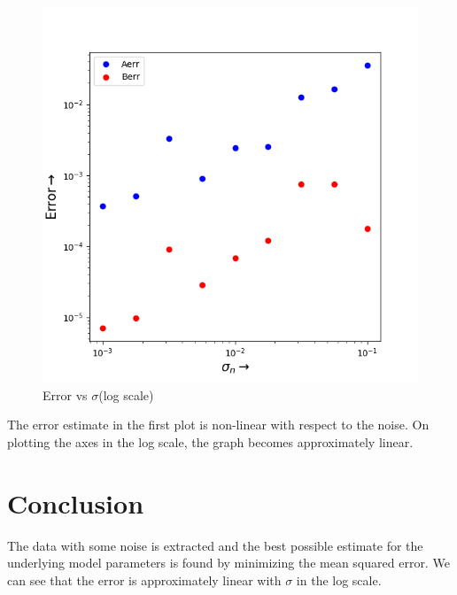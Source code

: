 \documentclass[11pt, a4paper]{article}
\begin{document}
\begin{figure}[!ht]
   	\centering
   	\includegraphics[scale=0.5]{error_vs_sigma_plot_log_scale.png}  %
   	\caption{Error vs $\sigma$(log scale)}
   	\label{fig:fig5}
\end{figure}

The error estimate in the first plot is non-linear with respect to the noise.
On plotting the axes in the log scale, the graph becomes approximately linear.

\section{Conclusion}
The data with some noise is extracted and the best possible estimate for the
underlying model parameters is found by minimizing the mean squared
error.
We can see that the error is approximately linear with $\sigma$ in the
log scale.
\end{document}
